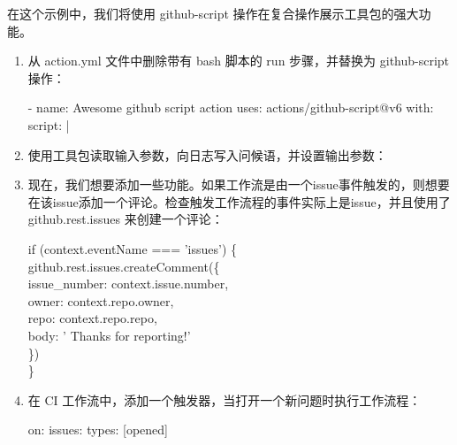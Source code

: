 在这个示例中，我们将使用 github-script 操作在复合操作展示工具包的强大功能。


\begin{enumerate}
\item 
从 action.yml 文件中删除带有 bash 脚本的 run 步骤，并替换为 github-script 操作：

\begin{shell}
- name: Awesome github script action
  uses: actions/github-script@v6
  with:
    script: |
\end{shell}

\item 
使用工具包读取输入参数，向日志写入问候语，并设置输出参数：


\item 
现在，我们想要添加一些功能。如果工作流是由一个issue事件触发的，则想要在该issue添加一个评论。检查触发工作流程的事件实际上是issue，并且使用了 github.rest.issues 来创建一个评论：

\begin{tcolorbox}[ breakable,colback = bashcodebg, colframe= black!50!white]
\scriptsize{
if (context.eventName === 'issues') \{ \\
\hspace*{1em}github.rest.issues.createComment(\{ \\
\hspace*{2em}issue\_number: context.issue.number, \\
\hspace*{2em}owner: context.repo.owner, \\
\hspace*{2em}repo: context.repo.repo, \\
\hspace*{2em}body: ' Thanks for reporting!' \\
\hspace*{1em}\}) \\
\}
}
\end{tcolorbox}

\item 
在 CI 工作流中，添加一个触发器，当打开一个新问题时执行工作流程：

\begin{shell}
on:
  issues:
    types: [opened]
\end{shell}


\end{enumerate}
